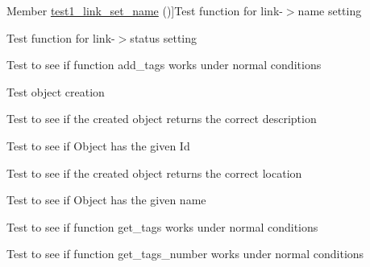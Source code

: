 \begin{DoxyRefList}
\hypertarget{test__test000127}{}%
Member \hyperlink{link__test_8h_ae0e478a0540bed26befc071591e3ff6c}{test1\+\_\+link\+\_\+set\+\_\+name} ()]Test function for link-\/$>$name setting  
\item[\label{test__test000133}%
\hypertarget{test__test000133}{}%
Member \hyperlink{link__test_8h_a3b39fdba0c3c967716572bfb01beec27}{test1\+\_\+link\+\_\+set\+\_\+status} ()]Test function for link-\/$>$status setting  
\item[\label{test__test000164}%
\hypertarget{test__test000164}{}%
Member \hyperlink{object__test_8h_a1f1fd465442a100acc9f1a31b2f84116}{test1\+\_\+object\+\_\+add\+\_\+tags} ()]Test to see if function add\+\_\+tags works under normal conditions  
\item[\label{test__test000146}%
\hypertarget{test__test000146}{}%
Member \hyperlink{object__test_8h_a3836d69f92ce7149d56bafcaec83f516}{test1\+\_\+object\+\_\+create} ()]Test object creation  
\item[\label{test__test000162}%
\hypertarget{test__test000162}{}%
Member \hyperlink{object__test_8h_a73c676e5d625179d75b96eed035a0876}{test1\+\_\+object\+\_\+get\+\_\+check} ()]Test to see if the created object returns the correct description  
\item[\label{test__test000158}%
\hypertarget{test__test000158}{}%
Member \hyperlink{object__test_8h_aa88e9e9dab92ba9c58851d7a7a8415f0}{test1\+\_\+object\+\_\+get\+\_\+id} ()]Test to see if Object has the given Id  
\item[\label{test__test000160}%
\hypertarget{test__test000160}{}%
Member \hyperlink{object__test_8h_ac62fbd4db0970e9942aa900a3ee2bba4}{test1\+\_\+object\+\_\+get\+\_\+location} ()]Test to see if the created object returns the correct location  
\item[\label{test__test000156}%
\hypertarget{test__test000156}{}%
Member \hyperlink{object__test_8h_ad2411bc3cc47c9905e63a3d9c561d369}{test1\+\_\+object\+\_\+get\+\_\+name} ()]Test to see if Object has the given name  
\item[\label{test__test000166}%
\hypertarget{test__test000166}{}%
Member \hyperlink{object__test_8h_a616fa3608be2e781974fe549549bf2a6}{test1\+\_\+object\+\_\+get\+\_\+tags} ()]Test to see if function get\+\_\+tags works under normal conditions  
\item[\label{test__test000168}%
\hypertarget{test__test000168}{}%
Member \hyperlink{object__test_8h_a0d964ae81c4084409e0fcc51bddd28b5}{test1\+\_\+object\+\_\+get\+\_\+tags\+\_\+number} ()]Test to see if function get\+\_\+tags\+\_\+number works under normal conditions  

\end{DoxyRefList}
